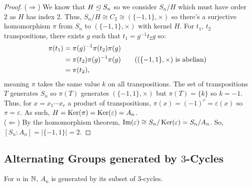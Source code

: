 \begin{proof}
    ($\Rightarrow$) We know that $H \trianglelefteq S_n$ so we consider $S_n / H$ 
    which must have order 2 as $H$ has index 2.
    Thus, $S_n / H \cong C_2 \cong (\{-1, 1\}, \times)$ so there's a 
    surjective homomorphism $\pi$ from $S_n$ to $(\{-1, 1\}, \times)$
    with kernel $H$. For $t_1$, $t_2$ transpositions, 
    there exists $g$ such that $t_1 = g^{-1}t_2g$ so: \begin{align*}
        \pi(t_1) 
        &= \pi(g)^{-1}\pi(t_2)\pi(g) \\
        &= \pi(t_2)\pi(g)^{-1}\pi(g) \tag{$(\{-1, 1\}, \times)$ is abelian}\\
        &= \pi(t_2),
    \end{align*} meaning $\pi$ takes the same value $k$ on all transpositions.
    The set of transpositions $T$ generates $S_n$ so $\pi(T)$ generates
    $(\{-1, 1\}, \times)$ but $\pi(T) = \{k\}$ so $k = -1$. Thus,
    for $x = x_1 \cdots x_r$ a product of transpositions, 
    $\pi(x) = (-1)^r = \varepsilon(x)$ so $\pi = \varepsilon$.
    As such, $H = \operatorname{Ker}(\pi) = \operatorname{Ker}(\varepsilon) = A_n$.
    \\[\baselineskip]
    ($\Leftarrow$) By the homomorphism theorem, 
    $\operatorname{Im}(\varepsilon) \cong S_n / \operatorname{Ker}(\varepsilon) = S_n / A_n$.
    So, \linebreak $[S_n : A_n] = |\{-1, 1\}| = 2$.
\end{proof}

\subsection{Alternating Groups generated by $3$-Cycles}

For $n$ in $\mathbb{N}$, $A_n$ is generated by its subset of $3$-cycles.


